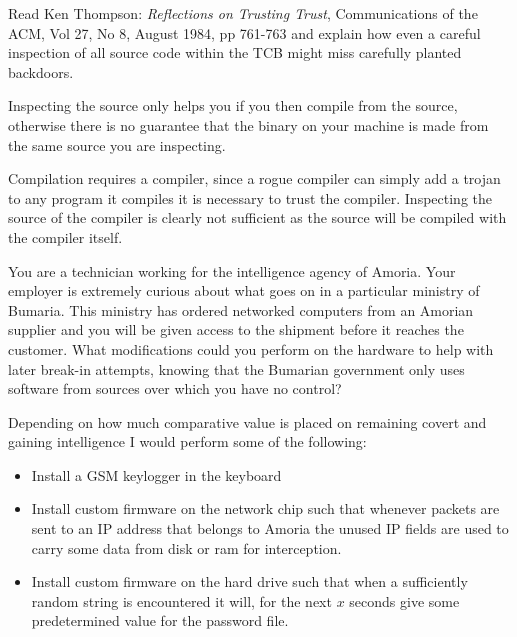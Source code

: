 \documentclass{supervision}
\begin{document}
  \begin{questions}
    \question Read Ken Thompson: \textit{Reflections on Trusting Trust},
      Communications of the ACM, Vol 27, No 8, August 1984, pp 761-763 and
      explain how even a careful inspection of all source code within the TCB
      might miss carefully planted backdoors.
      \begin{solution}
        Inspecting the source only helps you if you then compile from the
        source, otherwise there is no guarantee that the binary on your machine
        is made from the same source you are inspecting.

        Compilation requires a compiler, since a rogue compiler can simply
        add a trojan to any program it compiles it is necessary to trust the
        compiler. Inspecting the source of the compiler is clearly not
        sufficient as the source will be compiled with the compiler itself.
      \end{solution}

    \question You are a technician working for the intelligence agency of
      Amoria. Your employer is extremely curious about what goes on in a
      particular ministry of Bumaria. This ministry has ordered networked
      computers from an Amorian supplier and you will be given access to the
      shipment before it reaches the customer. What modifications could you
      perform on the hardware to help with later break-in attempts, knowing that
      the Bumarian government only uses software from sources over which you
      have no control?
      \begin{solution}
        Depending on how much comparative value is placed on remaining covert
        and gaining intelligence I would perform some of the following:

        \begin{itemize}
          \item Install a GSM keylogger in the keyboard
          \item Install custom firmware on the network chip such that whenever
            packets are sent to an IP address that belongs to Amoria the unused
            IP fields are used to carry some data from disk or ram for
            interception.
          \item Install custom firmware on the hard drive such that when a
            sufficiently random string is encountered it will, for the next $x$
            seconds give some predetermined value for the password file.
        \end{itemize}
      \end{solution}


\end{questions}
\end{document}
